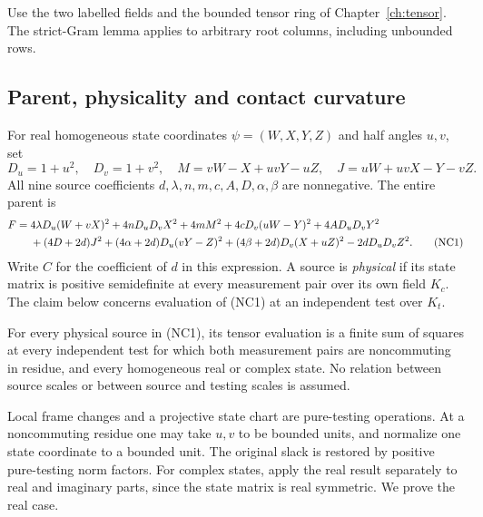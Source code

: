 \label{component:pe25c50379365}
\label{component:p76173e99815f}
\label{component:p24f8a75e651e}
\label{component:p4e9ae18b7af4}
\label{component:pa2cbe6ecbeb4}
\label{component:pb16e5066334b}
\label{component:pf47f6a4e3a60}
\label{component:p94dfbc8a5970}
\label{component:p2c3fc22497a5}

\label{sec:noncommuting-refined}

Use the two labelled fields and the bounded tensor ring of
Chapter~\ref{ch:tensor}. The strict-Gram lemma applies to arbitrary
root columns, including unbounded rows.

\subsection{Parent, physicality and contact curvature}

For real homogeneous state coordinates $\psi=(W,X,Y,Z)$ and half angles
$u,v$, set
\[
 D_u=1+u^2,\quad D_v=1+v^2,\quad
 M=vW-X+uvY-uZ,\quad J=uW+uvX-Y-vZ.
\]
All nine source coefficients $d,\lambda,n,m,c,A,D,\alpha,\beta$ are
nonnegative. The entire parent is
\begin{align}
 F={}&4\lambda D_u(W+vX)^2+4nD_uD_vX^2+4mM^2
       +4cD_v(uW-Y)^2+4AD_uD_vY^2\notag\\
 &+(4D+2d)J^2+(4\alpha+2d)D_u(vY-Z)^2
       +(4\beta+2d)D_v(X+uZ)^2-2dD_uD_vZ^2.
 \tag{NC1}
\end{align}
Write $C$ for the coefficient of $d$ in this expression. A source is
\emph{physical} if its state matrix is positive semidefinite at every
measurement pair over its own field $K_c$. The claim below concerns
evaluation of (NC1) at an independent test over $K_t$.

\begin{theorem}\label{thm:noncommuting-refined}
For every physical source in (NC1), its tensor evaluation is a finite
sum of squares at every independent test for which both measurement
pairs are noncommuting in residue, and every homogeneous real or
complex state. No relation between source scales or between source
and testing scales is assumed.
\end{theorem}

Local frame changes and a projective state chart are pure-testing
operations. At a noncommuting residue one may take $u,v$ to be bounded
units, and normalize one state coordinate to a bounded unit. The
original slack is restored by positive pure-testing norm factors.
For complex states, apply the real result separately to real and
imaginary parts, since the state matrix is real symmetric. We prove
the real case.

